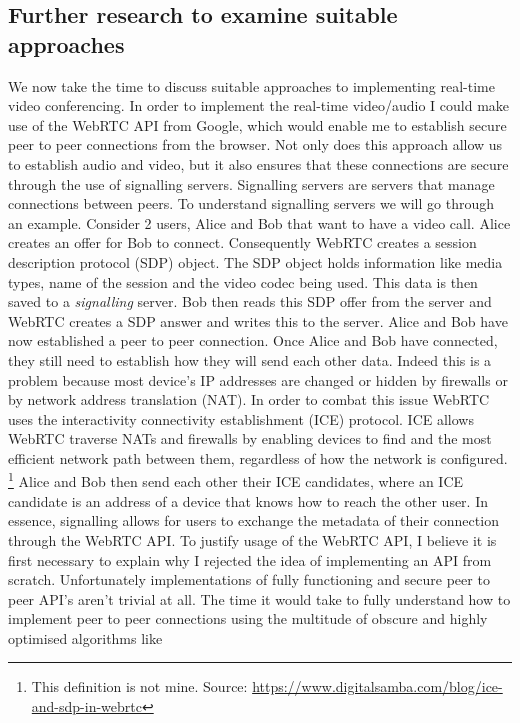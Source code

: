 \subsection{Further research to examine suitable approaches}
\label{sec:further}

We now take the time to discuss suitable approaches to
implementing real-time video conferencing. In 
order to implement the real-time video/audio I could make use
of the WebRTC API from Google, which would enable me to 
establish secure peer to peer connections from the browser. 
Not only does this approach allow us to establish audio and 
video, but it also ensures that these connections are secure 
through the use of signalling servers. Signalling servers are
servers that manage connections between peers. To understand 
signalling servers we will go through an example. Consider 2 
users, Alice and Bob that want to have a video call. Alice 
creates an offer for Bob to connect. Consequently WebRTC 
creates a session description protocol (SDP) object. The SDP 
object holds information like media types, name of the
session and the video codec being used.  This data is then 
saved to a \textit{signalling} server. Bob then reads this SDP
offer from the server and WebRTC creates a SDP answer and
writes this to the server. Alice and Bob have now established 
a peer to peer connection. Once Alice and Bob have connected,
they still need to establish how they will send each other data.
Indeed this is a problem because most device's IP addresses are
changed or hidden by firewalls or by network address translation 
(NAT). In order to combat this issue WebRTC uses the interactivity 
connectivity establishment (ICE) protocol. ICE allows WebRTC
traverse NATs and firewalls by enabling devices to find and 
the most efficient network path between them, regardless of
how the network is configured. \footnote{This definition is not mine. 
Source: \url{https://www.digitalsamba.com/blog/ice-and-sdp-in-webrtc}}
Alice and Bob then send each other their ICE candidates, where an ICE 
candidate is an address of a device that knows how to reach the 
other user. In essence, signalling allows for 
users to exchange the metadata of their connection through the
WebRTC API. To justify usage of the WebRTC API, I believe it 
is first necessary to explain why I rejected the idea of
implementing an API from scratch. Unfortunately
implementations of fully functioning and secure peer to peer
API's aren't trivial at all. The time it would take to fully
understand how to implement peer to peer connections using the
multitude of obscure and highly optimised algorithms like 
